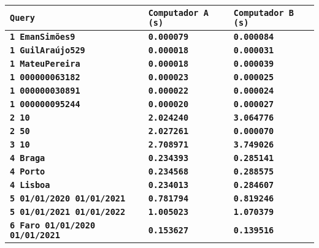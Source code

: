 \documentclass[12pt,a4paper]{report}
\begin{document}
{
\setlength\arrayrulewidth{1pt}
\begin{tabularx}{\textwidth} { 
  | >{\centering\arraybackslash}X
  | >{\centering\arraybackslash}X
  | >{\centering\arraybackslash}X | }
 \hline
 \texttt{\textbf{Query}} & \texttt{\textbf{Computador A (s)}} & \texttt{\textbf{Computador B (s)}} \\
 \hline
 \texttt{\textbf{1 EmanSimões9}} & \texttt{\textbf{0.000079}} & \texttt{\textbf{0.000084}} \\
 \hline
 \texttt{\textbf{1 GuilAraújo529}} & \texttt{\textbf{0.000018}} & \texttt{\textbf{0.000031}} \\
 \hline
 \texttt{\textbf{1 MateuPereira}} & \texttt{\textbf{0.000018}} & \texttt{\textbf{0.000039}} \\
 \hline
 \texttt{\textbf{1 000000063182}} & \texttt{\textbf{0.000023}} & \texttt{\textbf{0.000025}} \\
 \hline
 \texttt{\textbf{1 000000030891}} & \texttt{\textbf{0.000022}} & \texttt{\textbf{0.000024}} \\
 \hline
 \texttt{\textbf{1 000000095244}} & \texttt{\textbf{0.000020}} & \texttt{\textbf{0.000027}} \\
 \hline
 \texttt{\textbf{2 10}} & \texttt{\textbf{2.024240}} & \texttt{\textbf{3.064776}} \\
 \hline
 \texttt{\textbf{2 50}} & \texttt{\textbf{2.027261}} & \texttt{\textbf{0.000070}} \\
 \hline
 \texttt{\textbf{3 10}} & \texttt{\textbf{2.708971}} & \texttt{\textbf{3.749026}} \\
 \hline
 \texttt{\textbf{4 Braga}} & \texttt{\textbf{0.234393}} & \texttt{\textbf{0.285141}} \\
 \hline
 \texttt{\textbf{4 Porto}} & \texttt{\textbf{0.234568}} & \texttt{\textbf{0.288575}} \\
 \hline
 \texttt{\textbf{4 Lisboa}} & \texttt{\textbf{0.234013}} & \texttt{\textbf{0.284607}} \\
 \hline
 \texttt{\textbf{5 01/01/2020 01/01/2021}} & \vspace{-5pt}\texttt{\textbf{0.781794}} & \texttt{\textbf{0.819246}} \\
 \hline
 \texttt{\textbf{5 01/01/2021 01/01/2022}} & \vspace{-5pt}\texttt{\textbf{1.005023}} & \texttt{\textbf{1.070379}} \\
 \hline
 \texttt{\textbf{6 Faro 01/01/2020 01/01/2021}} & \vspace{-5pt}\texttt{\textbf{0.153627}} & \texttt{\textbf{0.139516}} \\

\end{tabularx}}
\end{document}
